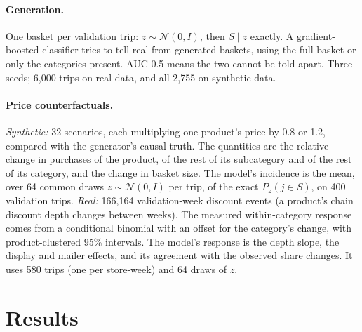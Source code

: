 \documentclass[11pt]{article}
\newcommand{\N}{\mathcal{N}}
\begin{document}
\paragraph{Generation.} One basket per validation trip: $z\sim\N(0,I)$, then $S\mid z$ exactly. A
gradient-boosted classifier tries to tell real from generated baskets, using the full basket or
only the categories present. AUC 0.5 means the two cannot be told apart. Three seeds; 6,000 trips on
real data, and all 2,755 on synthetic data.

\paragraph{Price counterfactuals.} \emph{Synthetic:} 32 scenarios, each multiplying one product's
price by 0.8 or 1.2, compared with the generator's causal truth. The quantities are the relative
change in purchases of the product, of the rest of its subcategory and of the rest of its category,
and the change in basket size. The model's incidence is the mean, over 64 common draws
$z\sim\N(0,I)$ per trip, of the exact $P_z(j\in S)$, on 400 validation trips. \emph{Real:} 166,164
validation-week discount events (a product's chain discount depth changes between weeks). The
measured within-category response comes from a conditional binomial with an offset for the
category's change, with product-clustered 95\% intervals. The model's response is the depth slope,
the display and mailer effects, and its agreement with the observed share changes. It uses 580 trips
(one per store-week) and 64 draws of $z$.

\section{Results}
\end{document}
